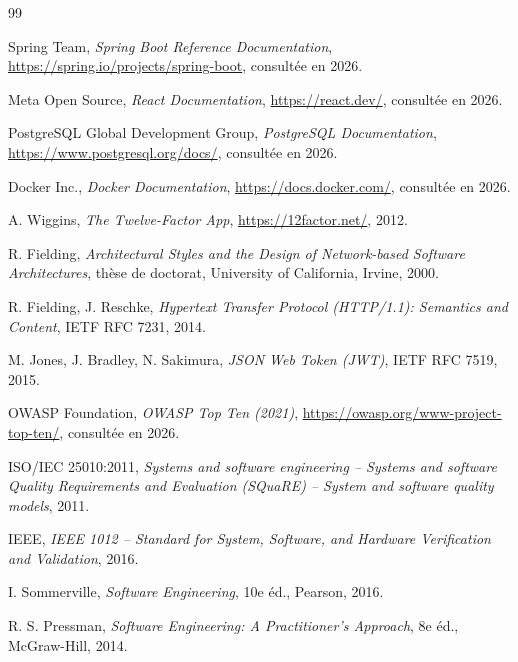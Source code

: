 \cleardoublepage
{}
\small
\footnotesize
\begin{thebibliography}{99}

Spring Team,
\emph{Spring Boot Reference Documentation},
\url{https://spring.io/projects/spring-boot}, consultée en 2026.

Meta Open Source,
\emph{React Documentation},
\url{https://react.dev/}, consultée en 2026.

PostgreSQL Global Development Group,
\emph{PostgreSQL Documentation},    
\url{https://www.postgresql.org/docs/}, consultée en 2026.

Docker Inc.,
\emph{Docker Documentation},
\url{https://docs.docker.com/}, consultée en 2026.

A. Wiggins,
\emph{The Twelve-Factor App},
\url{https://12factor.net/}, 2012.

R. Fielding,
\emph{Architectural Styles and the Design of Network-based Software Architectures},
thèse de doctorat, University of California, Irvine, 2000.

R. Fielding, J. Reschke,
\emph{Hypertext Transfer Protocol (HTTP/1.1): Semantics and Content},
IETF RFC 7231, 2014.

M. Jones, J. Bradley, N. Sakimura,
\emph{JSON Web Token (JWT)},
IETF RFC 7519, 2015.

OWASP Foundation,
\emph{OWASP Top Ten (2021)},
\url{https://owasp.org/www-project-top-ten/}, consultée en 2026.

ISO/IEC 25010:2011,
\emph{Systems and software engineering -- Systems and software Quality Requirements and Evaluation (SQuaRE) -- System and software quality models},
2011.

IEEE,
\emph{IEEE 1012 -- Standard for System, Software, and Hardware Verification and Validation},
2016.

I. Sommerville,
\emph{Software Engineering},
10e éd., Pearson, 2016.

R. S. Pressman,
\emph{Software Engineering: A Practitioner's Approach},
8e éd., McGraw-Hill, 2014.


\end{thebibliography}
